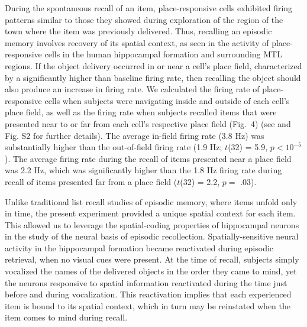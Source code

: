During the spontaneous recall of an item, place-responsive cells exhibited firing patterns similar to those they showed during exploration of the region of the town where the item was previously delivered.  Thus, recalling an episodic memory involves recovery of its spatial context, as seen in the activity of place-responsive cells in the human hippocampal formation and surrounding MTL regions. If the object delivery occurred in or near a cell's place field, characterized by a significantly higher than baseline firing rate, then recalling the object should also produce an increase in firing rate. We calculated the firing rate of place-responsive cells when subjects were navigating inside and outside of each cell's place field, as well as the firing rate when subjects recalled items that were presented near to or far from each cell's respective place field (Fig.~4) (see \cite{suppnote} and Fig. S2 for further details).  The average in-field firing rate (3.8 Hz) was substantially higher than the out-of-field firing rate  (1.9 Hz; $t$(32) = 5.9, $p < 10^{-5}$).  The average firing rate during the recall of items presented near a place field was 2.2 Hz, which was significantly higher than the 1.8 Hz firing rate during recall of items presented far from a place field ($t$(32) = 2.2, $p =$ .03).


Unlike traditional list recall studies of episodic memory, where items unfold only in time, the present experiment provided a unique spatial context for each item.  This allowed us to leverage the  spatial-coding properties of hippocampal neurons in the study of the neural basis of episodic recollection.  Spatially-sensitive neural activity in the hippocampal formation became reactivated during episodic retrieval, when no visual cues were present.  At the time of recall, subjects simply vocalized the names of the delivered objects in the order they came to mind, yet the neurons responsive to spatial  information reactivated during the time just before and during vocalization.  This reactivation implies  that  each experienced item is bound to its spatial context, which in turn may be reinstated when the item comes to mind during recall.  

